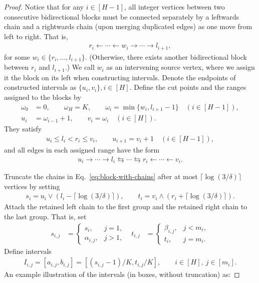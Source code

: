 \documentclass[11pt]{article}
\theoremstyle{statplain}
\theoremstyle{statdefinition}
\newcommand{\ra}{\rightarrow}
\newcommand{\la}{\leftarrow}
\newcommand{\0}{\mathbf{0}}
\newcommand{\discreteNum}{K} %
\begin{document}
\begin{proof}
Notice that for any $i\in[H-1]$, all integer vertices between two consecutive bidirectional blocks must be connected separately by a leftwards chain and a rightwards chain (upon merging duplicated edges) as one move from left to right. That is,
\begin{align*}
    r_i \la \cdots \la w_i \ra \cdots \ra l_{i+1},
\end{align*}
for some $w_i
\in \{r_i, \dots, l_{i+1}\}$. 
(Otherwise, there exists another bidirectional block between $r_i$ and $l_{i+1}$.) We call $w_i$ as an intervening source vertex, where we assign it the block on its left when constructing intervals. Denote the endpoints of constructed intervals as $\{u_i, v_i\}, i\in [H]$.
Define the cut points and the ranges assigned to the blocks by
\begin{align}\label{eq:block-assignment}
 \omega_0&=0,\qquad\omega_H=\discreteNum,\qquad
 \omega_i=\min\{w_i, l_{i+1}-1\}\quad(i\in[H-1]),\nonumber\\
 u_i&=\omega_{i-1}+1,\qquad v_i=\omega_i\quad(i\in[H]).
\end{align}
They satisfy
\begin{align*}
 u_i\leq l_i<r_i\leq v_i,
 \qquad u_{i+1}=v_i+1\quad(i\in[H-1]),
\end{align*}
and all edges in each assigned range have the form
\begin{align}\label{eq:block-with-chains}
 u_i\ra\cdots\ra l_i\leftrightarrows\cdots
 \leftrightarrows r_i\la\cdots\la v_i.
\end{align}



Truncate the chains in
Eq.~\eqref{eq:block-with-chains} after at most $\lceil \log(3/\delta)\rceil$ vertices by setting
\begin{align}\label{eq:truncated-block-endpoints}
 s_i=u_i\vee( l_i-\lceil \log(3/\delta)\rceil),\qquad
 t_i=v_i\wedge(r_i+\lceil \log(3/\delta)\rceil).
\end{align}
Attach the retained left chain to the first group and the retained
right chain to the last group. That is, set
\begin{align*}
 s_{i,j}&=
 \begin{cases}
  s_i,&j=1,\\
  \alpha_{i,j},&j>1,
 \end{cases}
 &
 t_{i,j}&=
 \begin{cases}
  \beta_{i,j},&j<m_i,\\
  t_i,&j=m_i.
 \end{cases}
\end{align*}
Define intervals
\begin{align}\label{eq:constructed-intervals}
 I_{i,j}=[a_{i,j},b_{i,j}]
 =[(s_{i,j}-1)/\discreteNum,t_{i,j}/\discreteNum],
 \qquad i\in[H],\ j\in[m_i].
\end{align}
An example illustration of the intervals (in boxes, without truncation) as: 


\end{proof}
\end{document}
